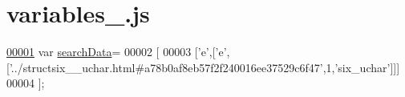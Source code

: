 \hypertarget{variables__5_8js_source}{}\section{variables\+\_.\+js}
\label{variables__5_8js_source}

\begin{DoxyCode}
\hypertarget{variables__5_8js_source.tex_l00001}{}\hyperlink{variables__5_8js_ad01a7523f103d6242ef9b0451861231e}{00001} var \hyperlink{variables__5_8js_ad01a7523f103d6242ef9b0451861231e}{searchData}=
00002 [
00003   [\textcolor{charliteral}{'e'},[\textcolor{charliteral}{'e'},[\textcolor{stringliteral}{'../structsix\_\_uchar.html#a78b0af8eb57f2f240016ee37529c6f47'},1,\textcolor{stringliteral}{'six\_uchar'}]]]
00004 ];
\end{DoxyCode}
